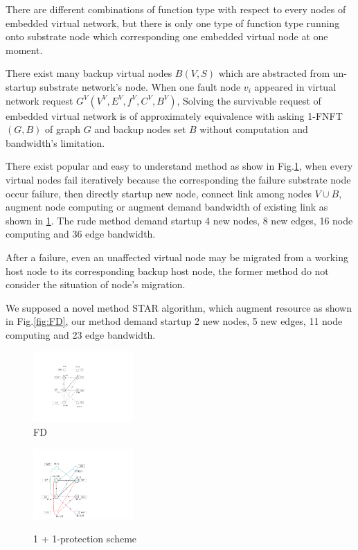 There are different combinations of function type with respect to  every nodes of embedded virtual network, but there is only one type of function type running onto substrate node which corresponding one embedded virtual node at one moment.

There exist many backup virtual nodes $B(V,S)$ which are abstracted from un-startup substrate network's node. When one fault node $v_i$ appeared in virtual network request $G^V (V^V,E^V,f^V,C^V,B^V)$, Solving the survivable request of embedded virtual network is of approximately equivalence with asking 1-FNFT$(G,B)$ of graph $G$ and backup nodes set $B$ without computation and bandwidth's limitation.

There exist popular and easy to understand method\cite{yeow2011designing} as show in Fig.\ref{fig:FI}, when every virtual nodes fail iteratively because the corresponding the failure substrate node occur failure, then directly startup new node, connect link among nodes $V\cup B$, augment node computing or augment demand bandwidth of existing link as shown in \ref{fig:FI}. The rude method demand startup 4 new nodes, 8 new edges, 16 node computing and 36 edge bandwidth.

After a failure, even an unaffected virtual node may be migrated from a working host node to its corresponding backup host node, the former method\cite{yeow2011designing} do not consider the situation of node's migration.


We supposed a novel method STAR algorithm, which augment resource as shown in Fig.\ref{fig:FD}, our method demand startup 2 new nodes, 5 new edges, 11 node computing and 23 edge bandwidth.

\begin{figure}
\centering
\begin{minipage}[t]{0.4\linewidth}
\centering
\includegraphics[width=1.5in]{Fig/FD}\\
\caption{ FD}\label{fig:FD}
\end{minipage}
\hfill
\begin{minipage}[t]{0.4\linewidth}
\centering
\includegraphics[width=1.5in]{Fig/FI}\\
\caption{1 + 1-protection scheme}\label{fig:FI}
\end{minipage}
\end{figure}





